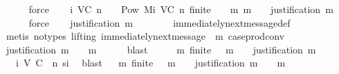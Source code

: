 \begin{isabellebody}
\ \ \ \ \isamarkupfalse%
\ force\isanewline
\isanewline
\ \ \isamarkupfalse%
\ {\isachardoublequoteopen}{\isasymSigma}i\ {\isacharparenleft}V{\isacharcomma}C{\isacharcomma}{\isasymepsilon}{\isacharparenright}\ {\isacharparenleft}n{\isacharplus}{}{\isacharparenright}\ {\isacharequal}\ {\isacharbraceleft}{\isasymsigma}\ {\isasymin}\ Pow\ {\isacharparenleft}Mi\ {\isacharparenleft}V{\isacharcomma}C{\isacharcomma}{\isasymepsilon}{\isacharparenright}\ n{\isacharparenright}{\isachardot}\ finite\ {\isasymsigma}\ {\isasymand}\ {\isacharparenleft}{\isasymforall}\ m{\isachardot}\ m\ {\isasymin}\ {\isasymsigma}\ {\isasymlongrightarrow}\ justification\ m\ {\isasymsubseteq}\ {\isasymsigma}{\isacharparenright}{\isacharbraceright}{\isachardoublequoteclose}\isanewline
\ \ \ \ \isamarkupfalse%
\ force\isanewline
\isanewline
\ \ \isamarkupfalse%
\ {\isachardoublequoteopen}justification\ m\ {\isasymsubseteq}\ {\isasymsigma}{\isachardoublequoteclose}\isanewline
\ \ \ \ \isamarkupfalse%
\ immediately{\isacharunderscore}next{\isacharunderscore}message{\isacharunderscore}def\isanewline
\ \ \ \ \isamarkupfalse%
\ {\isacharparenleft}metis\ {\isacharparenleft}no{\isacharunderscore}types{\isacharcomma}\ lifting{\isacharparenright}\ {\isacartoucheopen}immediately{\isacharunderscore}next{\isacharunderscore}message\ {\isacharparenleft}{\isasymsigma}{\isacharcomma}\ m{\isacharparenright}{\isacartoucheclose}\ case{\isacharunderscore}prod{\isacharunderscore}conv{\isacharparenright}\isanewline
\ \ \isamarkupfalse%
\ {\isachardoublequoteopen}justification\ m\ {\isasymsubseteq}\ {\isasymsigma}\ {\isasymunion}\ {\isacharbraceleft}m{\isacharbraceright}{\isachardoublequoteclose}\isanewline
\ \ \ \ \isamarkupfalse%
\ blast\isanewline
\ \ \isamarkupfalse%
\ \isamarkupfalse%
\ {\isachardoublequoteopen}{\isasymAnd}m{\isacharprime}{\isachardot}\ finite\ {\isasymsigma}\ {\isasymand}\ m{\isacharprime}\ {\isasymin}\ {\isasymsigma}\ {\isasymLongrightarrow}\ justification\ m{\isacharprime}\ {\isasymsubseteq}\ {\isasymsigma}{\isachardoublequoteclose}\isanewline
\ \ \ \ \isamarkupfalse%
\ {\isacartoucheopen}{\isasymsigma}\ {\isasymin}\ {\isasymSigma}i\ {\isacharparenleft}V{\isacharcomma}\ C{\isacharcomma}\ {\isasymepsilon}{\isacharparenright}\ n{\isacartoucheclose}\ si\ \isamarkupfalse%
\ blast\isanewline
\ \ \isamarkupfalse%
{\isachardoublequoteopen}{\isasymAnd}m{\isacharprime}{\isachardot}\ finite\ {\isasymsigma}\ {\isasymand}\ m{\isacharprime}\ {\isasymin}\ {\isasymsigma}\ {\isasymLongrightarrow}\ justification\ m{\isacharprime}\ {\isasymsubseteq}\ {\isasymsigma}\ {\isasymunion}\ {\isacharbraceleft}m{\isacharbraceright}{\isachardoublequoteclose}\isanewline

\end{isabellebody}
